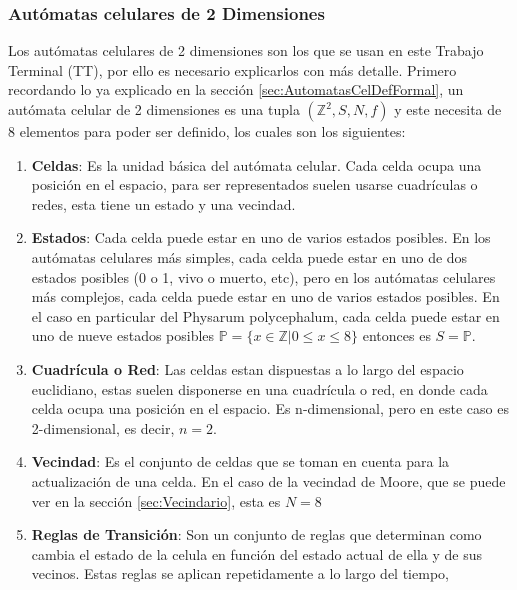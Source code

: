 \subsubsection{Aut\'omatas celulares de 2 Dimensiones}
\label{sec:AutomatasCel2D}

    Los aut\'omatas celulares de 2 dimensiones son los que se usan en este Trabajo Terminal (TT), por ello es necesario
        explicarlos con m\'as detalle. Primero recordando lo ya explicado en la secci\'on \ref{sec:AutomatasCelDefFormal}, un aut\'omata
        celular de 2 dimensiones es una tupla $({\mathbb{Z}^{2}},S,N,f)$ y este 
        necesita de 8 elementos para poder ser definido, los cuales son los siguientes:         
    \begin{enumerate}
        \item \textbf{Celdas}: Es la unidad b\'asica del aut\'omata celular. Cada celda ocupa una posici\'on en el espacio, 
            para ser representados suelen usarse cuadr\'iculas o redes, esta tiene un estado y una vecindad.
        \item \textbf{Estados}: Cada celda puede estar en uno de varios estados posibles. En los aut\'omatas celulares
            m\'as simples, cada celda puede estar en uno de dos estados posibles (0 o 1, vivo o muerto, etc), pero en los 
            aut\'omatas celulares m\'as complejos, cada celda puede estar en uno de varios estados posibles. En el caso 
            en particular del Physarum polycephalum, cada celda puede estar en uno de nueve estados posibles 
            $\mathbb{P} = \{x \in \mathbb{Z}| 0 \leq x \leq 8\}$ entonces es $S = \mathbb{P}$.
        \item \textbf{Cuadr\'icula o Red}: Las celdas estan dispuestas a lo largo del espacio euclidiano, estas 
            suelen disponerse en una cuadr\'icula o red, en donde cada celda ocupa una posici\'on en el espacio. Es
            n-dimensional, pero en este caso es 2-dimensional, es decir, $n = 2$.
        \item \textbf{Vecindad}: Es el conjunto de celdas que se toman en cuenta para la actualizaci\'on de una celda. En el caso de
            la vecindad de Moore, que se puede ver en la secci\'on \ref{sec:Vecindario}, esta es $N = 8$
        \item \textbf{Reglas de Transici\'on}: Son un conjunto de reglas que determinan como cambia el estado de la celula en 
            funci\'on del estado actual de ella y de sus vecinos. Estas reglas se aplican repetidamente a lo largo del tiempo,

\end{enumerate}
